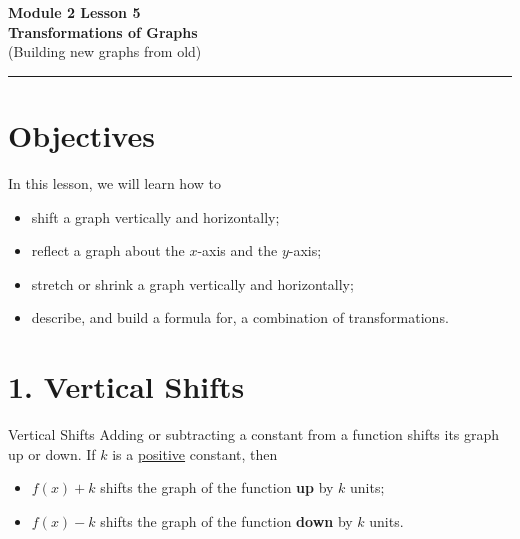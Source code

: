 \documentclass[12pt]{article}
\begin{document}
\handwriting

\begin{center}
    \Large\textbf{\color{primaryblue}Module 2 Lesson 5\\Transformations of Graphs} \\
    \large (Building new graphs from old) \\
    \vspace{0.2cm}
    \hrule
\end{center}

\section*{Objectives}

\begin{friendlyrule}{In this lesson, we will learn how to}
\begin{itemize}
    \item shift a graph vertically and horizontally;
    \item reflect a graph about the $x$-axis and the $y$-axis;
    \item stretch or shrink a graph vertically and horizontally;
    \item describe, and build a formula for, a combination of transformations.
\end{itemize}
\end{friendlyrule}

\section*{1. Vertical Shifts}

\begin{friendlyrule}{Vertical Shifts}
Adding or subtracting a constant from a function shifts its graph up or down. If $k$ is a \underline{positive} constant, then
\begin{itemize}
    \item $f(x)+k$ shifts the graph of the function \textbf{up} by $k$ units;
    \item $f(x)-k$ shifts the graph of the function \textbf{down} by $k$ units.
\end{itemize}
\end{friendlyrule}

\begin{center}
\end{center}
\end{document}

